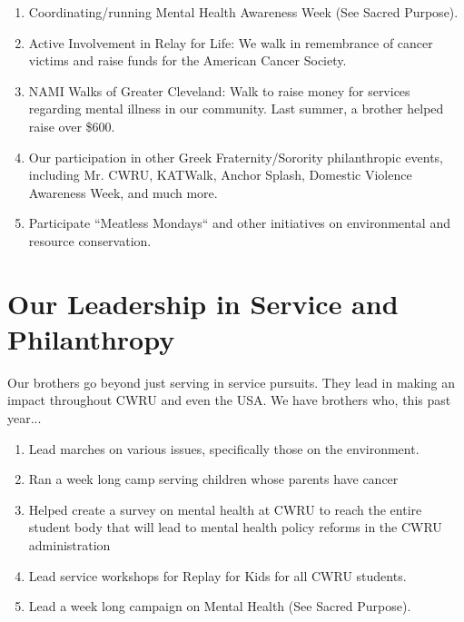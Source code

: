       \begin{enumerate}
      	\item Coordinating/running Mental Health Awareness Week (See Sacred Purpose).      	
      	\item Active Involvement in Relay for Life: We walk in remembrance of cancer victims and raise funds for the American Cancer Society.      	
      	\item NAMI Walks of Greater Cleveland: Walk to raise money for services regarding mental illness in our community. Last summer, a brother helped raise over \$600.
      	\item Our participation in other Greek Fraternity/Sorority philanthropic events, including Mr. CWRU, KATWalk, Anchor Splash, Domestic Violence Awareness Week, and much more.      	
      	\item Participate ``Meatless Mondays`` and other initiatives on environmental and resource conservation.
      \end{enumerate}
      
    \section*{Our Leadership in Service and Philanthropy}
      Our brothers go beyond just serving in service pursuits. They lead in making an impact throughout CWRU and even the USA. We have brothers who, this past year...
      
      \begin{enumerate}      	
      	\item Lead marches on various issues, specifically those on the environment.
      	\item Ran a week long camp serving children whose parents have cancer
      	\item Helped create a survey on mental health at CWRU to reach the entire student body that will lead to mental health policy reforms in the CWRU administration
      	\item Lead service workshops for Replay for Kids for all CWRU students.
      	\item Lead a week long campaign on Mental Health (See Sacred Purpose).
      \end{enumerate}